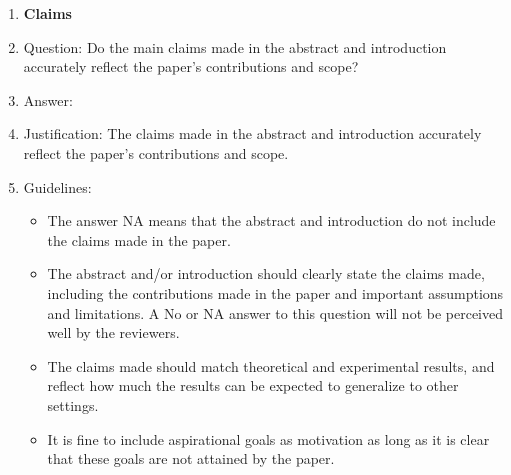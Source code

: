 \documentclass{article}
\begin{document}
 



\begin{enumerate}

\item {\bf Claims}
    \item[] Question: Do the main claims made in the abstract and introduction accurately reflect the paper's contributions and scope?
    \item[] Answer: \answerYes{} %
    \item[] Justification: The claims made in the abstract and introduction accurately reflect the paper's contributions and scope. 
    \item[] Guidelines:
    \begin{itemize}
        \item The answer NA means that the abstract and introduction do not include the claims made in the paper.
        \item The abstract and/or introduction should clearly state the claims made, including the contributions made in the paper and important assumptions and limitations. A No or NA answer to this question will not be perceived well by the reviewers. 
        \item The claims made should match theoretical and experimental results, and reflect how much the results can be expected to generalize to other settings. 
        \item It is fine to include aspirational goals as motivation as long as it is clear that these goals are not attained by the paper. 
    \end{itemize}


\end{enumerate}
\end{document}
